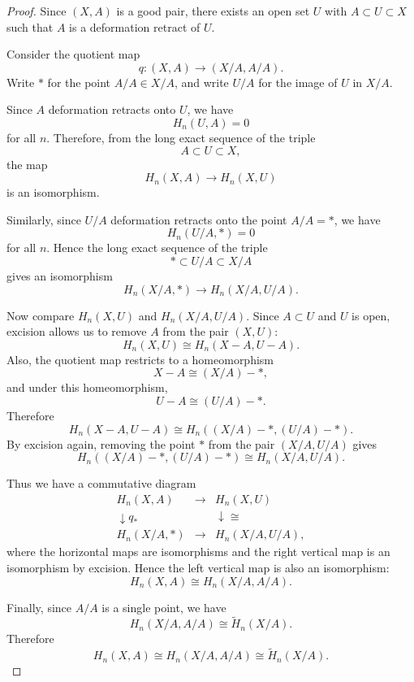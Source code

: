 \documentclass[11pt,a4paper]{article}
\theoremstyle{definition}
\theoremstyle{plain}
\theoremstyle{remark}
\newcommand{\1}{\mathbbm{1}}
\begin{document}
\begin{proof}
    Since $(X,A)$ is a good pair, there exists an open set $U$ with
    $A \subset U \subset X$ such that $A$ is a deformation retract of $U$.

    Consider the quotient map
    \[
        q : (X,A) \to (X/A,A/A).
    \]
    Write $*$ for the point $A/A \in X/A$, and write $U/A$ for the image of
    $U$ in $X/A$.

    Since $A$ deformation retracts onto $U$, we have
    \[
        H_n(U,A) = 0
    \]
    for all $n$. Therefore, from the long exact sequence of the triple
    \[
        A \subset U \subset X,
    \]
    the map
    \[
        H_n(X,A) \to H_n(X,U)
    \]
    is an isomorphism.

    Similarly, since $U/A$ deformation retracts onto the point $A/A = *$,
    we have
    \[
        H_n(U/A,*) = 0
    \]
    for all $n$. Hence the long exact sequence of the triple
    \[
        * \subset U/A \subset X/A
    \]
    gives an isomorphism
    \[
        H_n(X/A,*) \to H_n(X/A,U/A).
    \]

    Now compare $H_n(X,U)$ and $H_n(X/A,U/A)$. Since $A \subset U$ and
    $U$ is open, excision allows us to remove $A$ from the pair $(X,U)$:
    \[
        H_n(X,U) \cong H_n(X - A, U - A).
    \]
    Also, the quotient map restricts to a homeomorphism
    \[
        X - A \cong (X/A) - *,
    \]
    and under this homeomorphism,
    \[
        U - A \cong (U/A) - *.
    \]
    Therefore
    \[
        H_n(X - A, U - A)
        \cong
        H_n((X/A)-*, (U/A)-*).
    \]
    By excision again, removing the point $*$ from the pair $(X/A,U/A)$ gives
    \[
        H_n((X/A)-*, (U/A)-*)
        \cong
        H_n(X/A,U/A).
    \]

    Thus we have a commutative diagram
    \[
    \begin{array}{ccc}
        H_n(X,A) & \longrightarrow & H_n(X,U) \\
        \downarrow q_* & & \downarrow \cong \\
        H_n(X/A,*) & \longrightarrow & H_n(X/A,U/A),
    \end{array}
    \]
    where the horizontal maps are isomorphisms and the right vertical map is
    an isomorphism by excision. Hence the left vertical map is also an
    isomorphism:
    \[
        H_n(X,A) \cong H_n(X/A,A/A).
    \]

    Finally, since $A/A$ is a single point, we have
    \[
        H_n(X/A,A/A) \cong \widetilde{H}_n(X/A).
    \]
    Therefore
    \[
        H_n(X,A) \cong H_n(X/A,A/A) \cong \widetilde{H}_n(X/A).
    \]
\end{proof}
\end{document}
